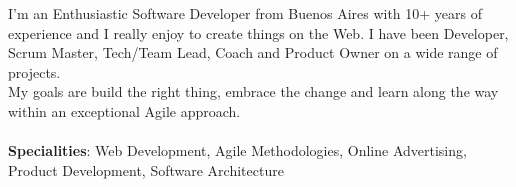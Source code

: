 
\begin{cvparagraph}
I'm an Enthusiastic Software Developer from Buenos Aires with 10+ years of experience and I really enjoy to create things on the Web. I have been Developer, Scrum Master, Tech/Team Lead, Coach and Product Owner on a wide range of projects.\\ My goals are build the right thing, embrace the change and learn along the way within an exceptional Agile approach.\\\\
\textbf{Specialities}: Web Development, Agile Methodologies, Online Advertising, Product Development, Software Architecture
\end{cvparagraph}
